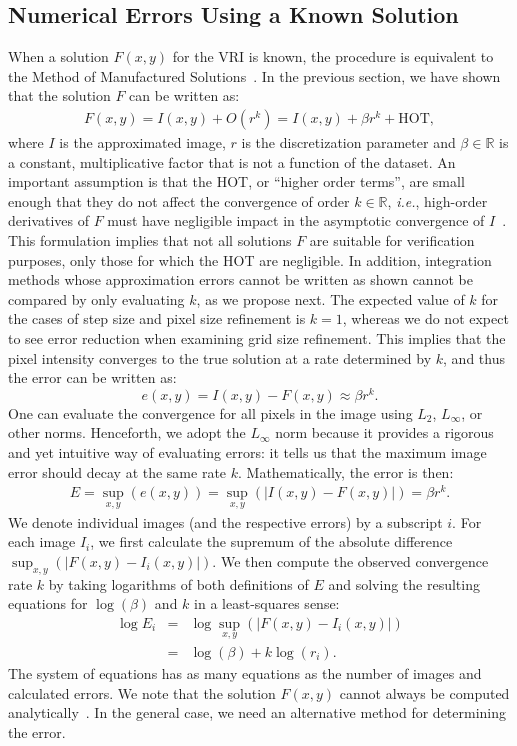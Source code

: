 \subsection{Numerical Errors Using a Known Solution}

When a solution $F(x,y)$ for the VRI is known, the procedure is equivalent
to the Method of Manufactured Solutions~\cite{babuska04}.  In the
previous section, we have shown that the 
solution $F$ can be written as:
\begin{eqnarray}
F(x,y) = I(x,y) + O(r^k) = I(x,y) + \beta r^k + \text{HOT},
\end{eqnarray}
where $I$ is the approximated image, $r$ is the discretization parameter 
and $\beta \in \mathbb{R}$ is a constant, multiplicative
factor that is not a function of the dataset. An important assumption
is that the HOT, or ``higher order terms'', are small enough that they
do not affect the convergence of order $k \in \mathbb{R}$, {\em i.e.}, high-order
derivatives of $F$ must have negligible impact in the asymptotic
convergence of $I$~\cite{Roy2005}. 
This formulation implies that not all solutions
$F$ are suitable for verification purposes, only those for which the HOT are
negligible. In addition, integration methods whose approximation errors 
cannot be written as shown
cannot be compared by only evaluating $k$, as we propose next. 
The expected value of $k$ for the cases of step size and pixel size 
refinement is $k = 1$, whereas we do not expect to see error reduction when 
examining grid size refinement. 
This implies that the pixel intensity
converges to the true solution at a rate determined by $k$, and
thus the error can be written as:
\begin{equation}
e(x,y) = I(x,y) - F(x,y) \approx \beta r^k.
\end{equation}
One can evaluate the convergence for all pixels in the image using
$L_2$, $L_\infty$, or other norms. Henceforth, we adopt the $L_\infty$ norm
because it provides a rigorous and yet intuitive way of evaluating errors: it tells us
that the maximum image error should decay at the same rate
$k$. Mathematically, the error is then:
\begin{eqnarray}
E = \sup_{x,y}(e(x,y)) = \sup_{x,y}(|I(x,y) - F(x,y)|) = \beta r^k.
\end{eqnarray}
We denote individual images (and the respective errors) by a
subscript $i$.  For each image $I_i$, we first calculate the supremum
of the absolute difference $\sup_{x,y}\left( |F(x,y) - I_i(x,y)|
\right)$.  We then compute the observed convergence rate $k$ by
taking logarithms of both definitions of $E$ and solving the resulting
equations for $\log(\beta)$ and $k$ in a least-squares sense:
\begin{eqnarray}
\log E_i &=& \log \sup_{x,y}\left( |F(x,y) - I_i(x,y)|
\right)\nonumber\\
         &=& \log(\beta) + k \log(r_i).
\label{eq:known-solution}
\end{eqnarray}
The system of equations has as many equations as the number of images
and calculated errors.  We note that the solution $F(x,y)$
cannot always be computed analytically~\cite{Max95}. In the general
case, we need an alternative method for determining the error.


